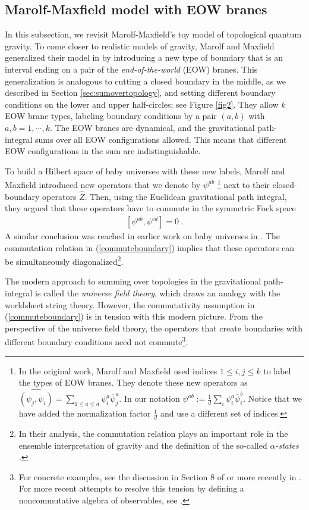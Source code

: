 \documentclass[a4paper,11pt]{article}
\theoremstyle{definition}
\numberwithin{equation}{section}
\begin{document}
\subsection{Marolf-Maxfield model with EOW branes}\label{subsec:MMEOW}

In this subsection, we revisit Marolf-Maxfield's toy model of topological quantum gravity. To come closer to realistic models of gravity, Marolf and Maxfield generalized their model in \cite{MM} by introducing a new type of boundary that is an interval ending on a pair of the {\it end-of-the-world} (EOW) branes. This generalization is analogous to cutting a closed boundary in the middle, as we described in Section \ref{sec:sumovertopology}, and setting different boundary conditions on the lower and upper half-circles; see Figure \ref{fig2}. They allow $k$ EOW brane types, labeling boundary conditions by a pair $(a,b)$ with $a,b=1,\cdots, k$. The EOW branes are dynamical, and the gravitational path-integral sums over all EOW configurations allowed. This means that different EOW configurations in the sum are indistinguishable.

To build a Hilbert space of baby universes with these new labels, Marolf and Maxfield introduced new operators that we denote by $\psi^{ab}$ \footnote{In the original work, Marolf and Maxfield used indices $1\leq i,j\leq k$ to label the types of EOW branes. They denote these new operators as $\widehat{(\psi_j,\psi_i)} = \sum_{1\leq a\leq d}\psi^a_i\bar{\psi}^a_j$. In our notation $\psi^{ab} := \frac{1}{d}\sum_{i}\psi^a_i\bar{\psi}^b_i$. Notice that we have added the normalization factor $\frac{1}{d}$ and use a different set of indices.} next to their closed-boundary operators $\hat{Z}$. Then, using the Euclidean gravitational path integral, they argued that these operators have to commute in the symmetric Fock space
\begin{eqnarray}\label{commuteboundary}
    [\psi^{ab}, \psi^{cd}]=0\ .
\end{eqnarray}
A similar conclusion was reached in earlier work on baby universes in \cite{coleman1988black,giddings1988loss}. 
The commutation relation in (\ref{commuteboundary}) implies that these operators can be simultaneously diagonalized\footnote{In their analysis, the commutation relation plays an important role in the ensemble interpretation of gravity and the definition of the so-called {\it $\alpha$-states} \cite{coleman1988black,MM}.}.

The modern approach to summing over topologies in the gravitational path-integral is called the {\it universe field theory}, which draws an analogy with the worldsheet string theory. However, the commutativity assumption in (\ref{commuteboundary}) is in tension with this modern picture. From the perspective of the universe field theory, the operators that create boundaries with different boundary conditions need not commute\footnote{For concrete examples, see the discussion in Section 8 of \cite{giddings1989baby} or more recently in \cite{anous2020density}. For more recent attempts to resolve this tension by defining a noncommutative algebra of observables, see \cite{casali2022baby}.}. 
\end{document}
